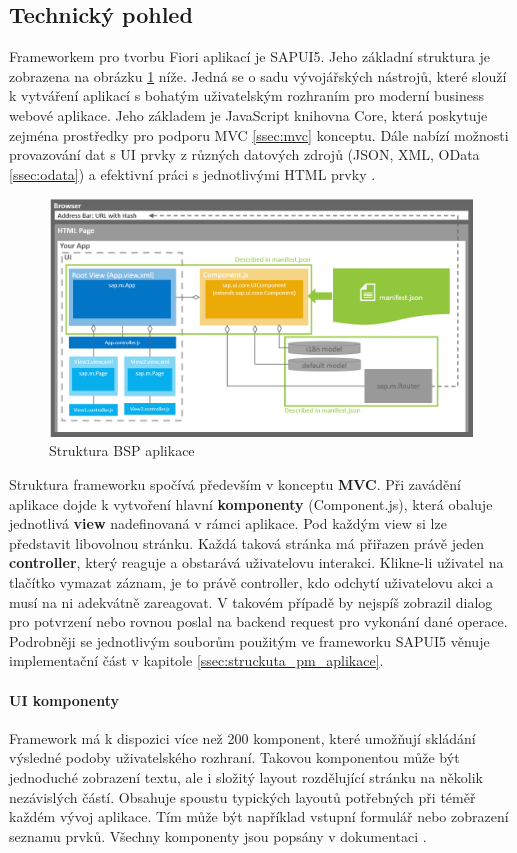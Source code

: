 \documentclass[thesis=M,czech]{FITthesis}[2012/06/26]
\begin{document}
\subsection{Technický pohled}
Frameworkem pro tvorbu Fiori aplikací je SAPUI5. Jeho základní struktura je zobrazena na obrázku \ref{img:fiori_arch} níže. Jedná se o sadu vývojářských nástrojů, které slouží k vytváření aplikací s bohatým uživatelským rozhraním pro moderní business webové aplikace. Jeho základem je JavaScript knihovna Core, která poskytuje zejména prostředky pro podporu MVC \ref{ssec:mvc} konceptu. Dále nabízí možnosti provazování dat s UI prvky z různých datových zdrojů (JSON, XML, OData \ref{ssec:odata}) a efektivní práci s jednotlivými HTML prvky \cite{sap_fiori_api}. 
\begin{figure}[H]
	\centering
	\includegraphics[width=1\textwidth]{images/fiori_arch.png}
	\caption{Struktura BSP aplikace \cite{fiori_structure}}
	\label{img:fiori_arch}
\end{figure}
Struktura frameworku spočívá především v konceptu \textbf{MVC}. Při zavádění aplikace dojde k vytvoření hlavní \textbf{komponenty} (Component.js), která obaluje jednotlivá \textbf{view} nadefinovaná v rámci aplikace. Pod každým view si lze představit libovolnou stránku. Každá taková stránka má přiřazen právě jeden \textbf{controller}, který reaguje a obstarává uživatelovu interakci. Klikne-li uživatel na tlačítko vymazat záznam, je to právě controller, kdo odchytí uživatelovu akci a musí na ni adekvátně zareagovat. V takovém případě by nejspíš zobrazil dialog pro potvrzení nebo rovnou poslal na backend request pro vykonání dané operace. Podrobněji se jednotlivým souborům použitým ve frameworku SAPUI5 věnuje implementační část v kapitole \ref{ssec:struckuta_pm_aplikace}.

\paragraph{UI komponenty}
Framework má k dispozici více než 200 komponent, které umožňují skládání výsledné podoby uživatelského rozhraní. Takovou komponentou může být jednoduché zobrazení textu, ale i složitý layout rozdělující stránku na několik nezávislých částí. Obsahuje spoustu typických layoutů potřebných při téměř každém vývoj aplikace. Tím může být například vstupní formulář nebo zobrazení seznamu prvků. Všechny komponenty jsou popsány v dokumentaci \cite{sap_fiori_api}.
\end{document}
